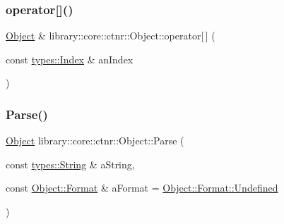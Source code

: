 \mbox{\label{classlibrary_1_1core_1_1ctnr_1_1_object_ae403f6b0f9a93430c45908262ff95e5d}} 
\subsubsection{\texorpdfstring{operator[]()}{operator[]()}\hspace{0.1cm}{\footnotesize\ttfamily [4/4]}}
{\footnotesize\ttfamily \hyperlink{classlibrary_1_1core_1_1ctnr_1_1_object}{Object} \& library\+::core\+::ctnr\+::\+Object\+::operator\mbox{[}$\,$\mbox{]} (\begin{DoxyParamCaption}\item[{const \hyperlink{namespacelibrary_1_1core_1_1types_ad87eeb821d7067ec94e06ed1980d6350}{types\+::\+Index} \&}]{an\+Index }\end{DoxyParamCaption})}

\mbox{\label{classlibrary_1_1core_1_1ctnr_1_1_object_a6b668c679c62e64f1b3f671e124d9687}} 
\subsubsection{\texorpdfstring{Parse()}{Parse()}}
{\footnotesize\ttfamily \hyperlink{classlibrary_1_1core_1_1ctnr_1_1_object}{Object} library\+::core\+::ctnr\+::\+Object\+::\+Parse (\begin{DoxyParamCaption}\item[{const \hyperlink{classlibrary_1_1core_1_1types_1_1_string}{types\+::\+String} \&}]{a\+String,  }\item[{const \hyperlink{classlibrary_1_1core_1_1ctnr_1_1_object_a7bf8961c4ef65f691aa2993ec405c647}{Object\+::\+Format} \&}]{a\+Format = {\ttfamily \hyperlink{classlibrary_1_1core_1_1ctnr_1_1_object_a7bf8961c4ef65f691aa2993ec405c647aec0fc0100c4fc1ce4eea230c3dc10360}{Object\+::\+Format\+::\+Undefined}} }\end{DoxyParamCaption})\hspace{0.3cm}{\ttfamily [static]}}

